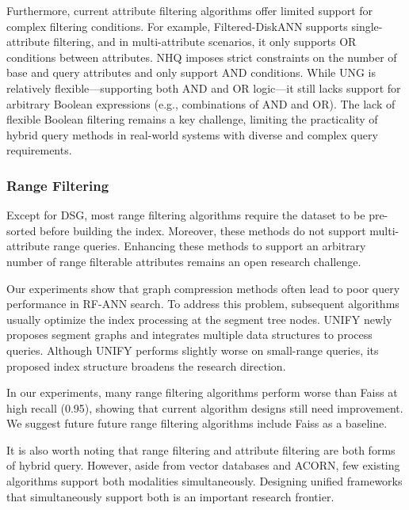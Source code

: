 \documentclass[sigconf, nonacm]{acmart}
\begin{document}
	Furthermore, current attribute filtering algorithms offer limited support for complex filtering conditions. For example, Filtered-DiskANN  supports single-attribute filtering, and in multi-attribute scenarios, it only supports OR conditions between attributes. 
	NHQ imposes strict constraints on the number of base and query attributes and only support AND conditions. While UNG is relatively flexible—supporting both AND and OR logic—it still lacks support for arbitrary Boolean expressions (e.g., combinations of AND and OR). The lack of flexible Boolean filtering remains a key challenge, limiting the practicality of hybrid query methods in real-world systems with diverse and complex query requirements.
	
	\subsubsection{\textbf{Range Filtering}}
	
	Except for DSG, most range filtering algorithms require the dataset to be pre-sorted before building the index. Moreover, these methods do not support multi-attribute range queries. Enhancing these methods to support an arbitrary number of range filterable attributes remains an open research challenge.
	
	Our experiments show that graph compression methods often lead to poor query performance in RF-ANN search. To address this problem, subsequent algorithms usually optimize the index processing at the segment tree nodes. UNIFY newly proposes segment graphs and integrates multiple data structures to process queries. Although UNIFY performs slightly worse on small-range queries, its proposed index structure broadens the research direction.
	
		In our experiments, many range filtering algorithms perform worse than Faiss at high recall (0.95), showing that current algorithm designs still need improvement. We suggest future future range filtering algorithms include Faiss as a baseline.
	
	
	It is also worth noting that range filtering and attribute filtering are both forms of hybrid query. However, aside from vector databases and ACORN, few existing algorithms support both modalities simultaneously. Designing unified frameworks that simultaneously support both is an important research frontier. 
	
\end{document}
